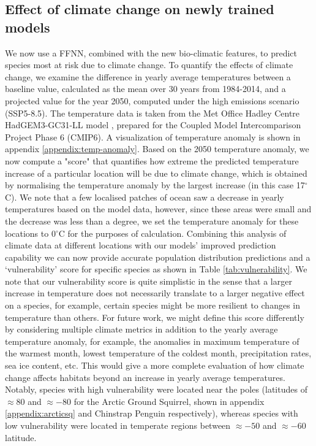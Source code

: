 \subsection{Effect of climate change on newly trained models}
We now use a FFNN, combined with the new bio-climatic features, to predict species most at risk due to climate change. To quantify the effects of climate change, we examine the difference in yearly average temperatures between a baseline value, calculated as the mean over 30 years from 1984-2014, and a projected value for the year 2050, computed under the high emissions scenario (SSP5-8.5). The temperature data is taken from the Met Office Hadley Centre HadGEM3-GC31-LL model \cite{met}, prepared for the Coupled Model Intercomparison Project Phase 6 (CMIP6). A visualization of temperature anomaly is shown in appendix \ref{appendix:temp-anomaly}. Based on the 2050 temperature anomaly, we now compute a "score" that quantifies how extreme the predicted temperature increase of a particular location will be due to climate change, which is obtained by normalising the temperature anomaly by the largest increase (in this case 17$^\circ$C). We note that a few localised patches of ocean saw a decrease in yearly temperatures based on the model data, however, since these areas were small and the decrease was less than a degree, we set the temperature anomaly for these locations to 0$^\circ$C for the purposes of calculation. Combining this analysis of climate data at different locations with our models' improved prediction capability we can now provide accurate population distribution predictions and a `vulnerability' score for specific species as shown in Table \ref{tab:vulnerability}. We note that our vulnerability score is quite simplistic in the sense that a larger increase in temperature does not necessarily translate to a larger negative effect on a species, for example, certain species might be more resilient to changes in temperature than others. For future work, we might define this score differently by considering multiple climate metrics in addition to the yearly average temperature anomaly, for example, the anomalies in maximum temperature of the warmest month, lowest temperature of the coldest month, precipitation rates, sea ice content, etc. This would give a more complete evaluation of how climate change affects habitats beyond an increase in yearly average temperatures. Notably, species with high vulnerability were located near the poles (latitudes of $\approx 80$ and $\approx-80$ for the Arctic Ground Squirrel, shown in appendix \ref{appendix:arcticsq} and Chinstrap Penguin respectively), whereas species with low vulnerability were located in temperate regions between $\approx-50$ and $\approx-60$ latitude.


